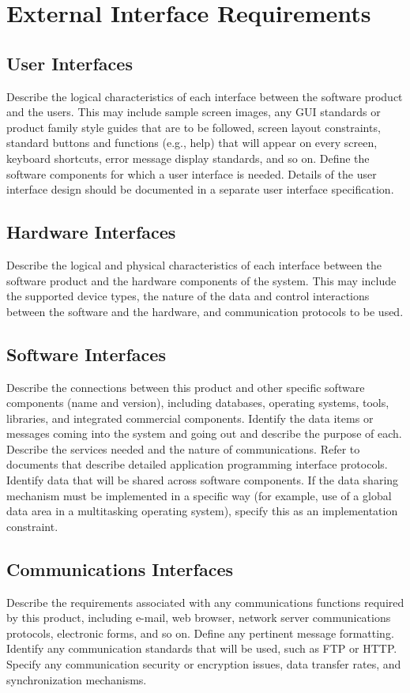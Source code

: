 \documentclass[12pt,oneside,letterpaper]{article}
\begin{document}
\section{External Interface Requirements}
\subsection{User Interfaces}
Describe the logical characteristics of each interface between the software product and the users. This may include sample screen images, any GUI standards or product family style guides that are to be followed, screen layout constraints, standard buttons and functions (e.g., help) that will appear on every screen, keyboard shortcuts, error message display standards, and so on. Define the software components for which a user interface is needed. Details of the user interface design should be documented in a separate user interface specification.
\subsection{Hardware Interfaces}
Describe the logical and physical characteristics of each interface between the software product and the hardware components of the system. This may include the supported device types, the nature of the data and control interactions between the software and the hardware, and communication protocols to be used.
\subsection{Software Interfaces}
Describe the connections between this product and other specific software components (name and version), including databases, operating systems, tools, libraries, and integrated commercial components. Identify the data items or messages coming into the system and going out and describe the purpose of each. Describe the services needed and the nature of communications. Refer to documents that describe detailed application programming interface protocols. Identify data that will be shared across software components. If the data sharing mechanism must be implemented in a specific way (for example, use of a global data area in a multitasking operating system), specify this as an implementation constraint.
\subsection{Communications Interfaces}
Describe the requirements associated with any communications functions required by this product, including e-mail, web browser, network server communications protocols, electronic forms, and so on. Define any pertinent message formatting. Identify any communication standards that will be used, such as FTP or HTTP. Specify any communication security or encryption issues, data transfer rates, and synchronization mechanisms.
\end{document}
